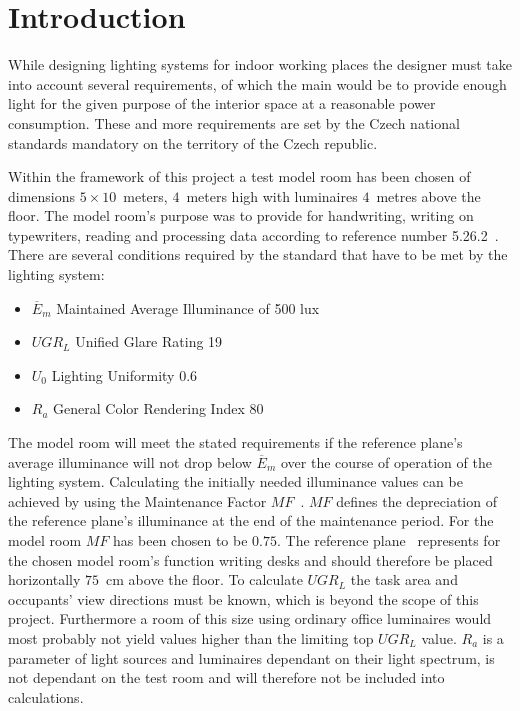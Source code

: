 \section{Introduction} \label{sec:intro}
While designing lighting systems for indoor working places the designer must take into account several requirements, of which the main would be to provide enough light for the given purpose of the interior space at a reasonable power consumption. These and more requirements are set by the Czech national standards \cite{12464} mandatory on the territory of the Czech republic.

Within the framework of this project a test model room has been chosen of dimensions $5 \times 10 $~meters, $4$~meters high with luminaires $4$~metres above the floor. The model room's purpose was to provide for handwriting, writing on typewriters, reading and processing data according to reference number 5.26.2~\cite{12464}. There are several conditions required by the standard that have to be met by the lighting system:


\begin{itemize}
	\item $\overline{E}_{m}$ Maintained Average Illuminance of 500 lux
	\item $UGR_{L}$ Unified Glare Rating 19
	\item $U_{0}$ Lighting Uniformity 0.6
	\item $R_{a}$ General Color Rendering Index 80
\end{itemize}

The model room will meet the stated requirements if the reference plane's average illuminance will not drop below $\overline{E}_{m}$ over the course of operation of the lighting system. Calculating the initially needed illuminance values can be achieved by using the Maintenance Factor $MF$~\cite{CIE97}. $MF$ defines the depreciation of the reference plane's illuminance at the end of the maintenance period. For the model room $MF$ has been chosen to be $0.75$. The reference plane~\cite{12464} represents for the chosen model room's function writing desks and should therefore be placed horizontally $75$~cm above the floor. To calculate $UGR_{L}$ the task area and occupants' view directions must be known, which is beyond the scope of this project. Furthermore a room of this size using ordinary office luminaires would most probably not yield values higher than the limiting top $UGR_{L}$ value. $R_{a}$ is a parameter of light sources and luminaires dependant on their light spectrum, is not dependant on the test room and will therefore not be included into calculations.
